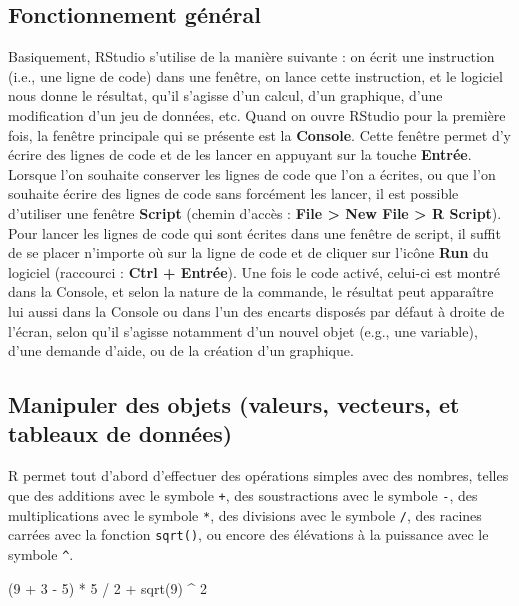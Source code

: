 \documentclass[
  letterpaper,
]{book}
\newenvironment{Shaded}{\begin{snugshade}}{\end{snugshade}}
\newcommand{\DecValTok}[1]{\textcolor[rgb]{0.68,0.00,0.00}{#1}}
\newcommand{\FunctionTok}[1]{\textcolor[rgb]{0.28,0.35,0.67}{#1}}
\newcommand{\NormalTok}[1]{\textcolor[rgb]{0.00,0.23,0.31}{#1}}
\newcommand{\SpecialCharTok}[1]{\textcolor[rgb]{0.37,0.37,0.37}{#1}}
\begin{document}
\subsection{Fonctionnement général}\label{fonctionnement-guxe9nuxe9ral}

Basiquement, RStudio s'utilise de la manière suivante : on écrit une
instruction (i.e., une ligne de code) dans une fenêtre, on lance cette
instruction, et le logiciel nous donne le résultat, qu'il s'agisse d'un
calcul, d'un graphique, d'une modification d'un jeu de données, etc.
Quand on ouvre RStudio pour la première fois, la fenêtre principale qui
se présente est la \textbf{Console}. Cette fenêtre permet d'y écrire des
lignes de code et de les lancer en appuyant sur la touche
\textbf{Entrée}. Lorsque l'on souhaite conserver les lignes de code que
l'on a écrites, ou que l'on souhaite écrire des lignes de code sans
forcément les lancer, il est possible d'utiliser une fenêtre
\textbf{Script} (chemin d'accès : \textbf{File \textgreater{} New File
\textgreater{} R Script}). Pour lancer les lignes de code qui sont
écrites dans une fenêtre de script, il suffit de se placer n'importe où
sur la ligne de code et de cliquer sur l'icône \textbf{Run} du logiciel
(raccourci : \textbf{Ctrl + Entrée}). Une fois le code activé, celui-ci
est montré dans la Console, et selon la nature de la commande, le
résultat peut apparaître lui aussi dans la Console ou dans l'un des
encarts disposés par défaut à droite de l'écran, selon qu'il s'agisse
notamment d'un nouvel objet (e.g., une variable), d'une demande d'aide,
ou de la création d'un graphique.

\subsection{Manipuler des objets (valeurs, vecteurs, et tableaux de
données)}\label{manipuler-des-objets-valeurs-vecteurs-et-tableaux-de-donnuxe9es}

R permet tout d'abord d'effectuer des opérations simples avec des
nombres, telles que des additions avec le symbole \texttt{+}, des
soustractions avec le symbole \texttt{-}, des multiplications avec le
symbole \texttt{*}, des divisions avec le symbole \texttt{/}, des
racines carrées avec la fonction \texttt{sqrt()}, ou encore des
élévations à la puissance avec le symbole \texttt{\^{}}.

\begin{Shaded}
\begin{Highlighting}[]
\NormalTok{(}\DecValTok{9} \SpecialCharTok{+} \DecValTok{3} \SpecialCharTok{{-}} \DecValTok{5}\NormalTok{) }\SpecialCharTok{*} \DecValTok{5} \SpecialCharTok{/} \DecValTok{2} \SpecialCharTok{+} \FunctionTok{sqrt}\NormalTok{(}\DecValTok{9}\NormalTok{) }\SpecialCharTok{\^{}} \DecValTok{2}
\end{Highlighting}
\end{Shaded}
\end{document}
